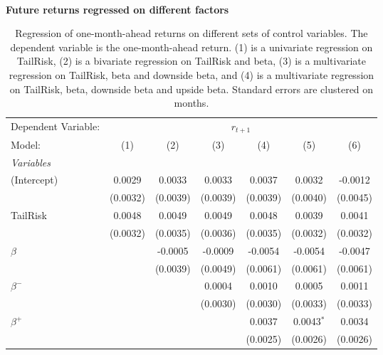 \begin{table}[H]
\caption{\\ \large{\textbf{Future returns regressed on different factors}}}
\captionsetup{justification = justified, width = \linewidth}
\caption*{Regression of one-month-ahead returns on different
                               sets of control variables. The dependent variable is
                               the one-month-ahead return. (1) is a univariate regression
                               on TailRisk, (2) is a bivariate regression on TailRisk and beta,
                               (3) is a multivariate regression on TailRisk, beta and downside 
                               beta, and (4) is a multivariate regression on TailRisk, beta,
                               downside beta and upside beta. Standard errors are clustered
                               on months.}
   \centering
\label{reg_clustered_on_time_1_TailRisk}
   \begin{tabular}{lcccccc}
      \tabularnewline \midrule \midrule
      Dependent Variable: & \multicolumn{6}{c}{$r_{t+1}$}\\
      Model:         & (1)      & (2)      & (3)      & (4)      & (5)          & (6)\\  
      \midrule
      \emph{Variables}\\
      (Intercept)    & 0.0029   & 0.0033   & 0.0033   & 0.0037   & 0.0032       & -0.0012\\   
                     & (0.0032) & (0.0039) & (0.0039) & (0.0039) & (0.0040)     & (0.0045)\\   
      TailRisk       & 0.0048   & 0.0049   & 0.0049   & 0.0048   & 0.0039       & 0.0041\\   
                     & (0.0032) & (0.0035) & (0.0036) & (0.0035) & (0.0032)     & (0.0032)\\   
      $\beta$        &          & -0.0005  & -0.0009  & -0.0054  & -0.0054      & -0.0047\\   
                     &          & (0.0039) & (0.0049) & (0.0061) & (0.0061)     & (0.0061)\\   
      $\beta^{-}$    &          &          & 0.0004   & 0.0010   & 0.0005       & 0.0011\\   
                     &          &          & (0.0030) & (0.0030) & (0.0033)     & (0.0033)\\   
      $\beta^{+}$    &          &          &          & 0.0037   & 0.0043$^{*}$ & 0.0034\\   
                     &          &          &          & (0.0025) & (0.0026)     & (0.0026)\\   

\end{tabular}
\end{table}
